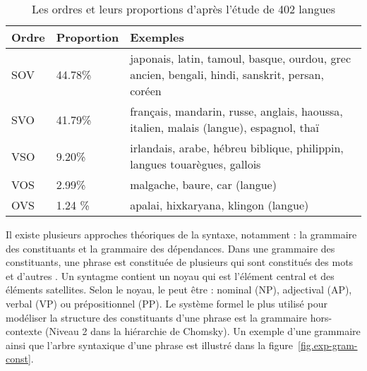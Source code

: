 \documentclass{KodeBook}
\begin{document}
\begin{table}[ht]
	\centering
	\begin{tabular}{p{}p{}p{}}
		\hline\hline 
		\textbf{Ordre} & \textbf{Proportion} & \textbf{Exemples} \\
		\hline
		SOV & 44.78\% & japonais, latin, tamoul, basque, ourdou, grec ancien, bengali, hindi, sanskrit, persan, coréen \\
		SVO & 41.79\% & français, mandarin, russe, anglais, haoussa, italien, malais (langue), espagnol, thaï \\
		VSO & 9.20\% & irlandais, arabe, hébreu biblique, philippin, langues touarègues, gallois \\
		VOS & 2.99\% & malgache, baure, car (langue) \\
		OVS & 1.24 \% & apalai, hixkaryana, klingon (langue) \\
		\hline\hline
	\end{tabular}
	\caption[Les ordres et leurs proportions d'après l'étude de 402 langues]{Les ordres et leurs proportions d'après l'étude de 402 langues \cite{1988-blake} \label{tab:ordre}}
\end{table}

Il existe plusieurs approches théoriques de la syntaxe, notamment : la grammaire des constituants et la grammaire des dépendances. 
Dans une grammaire des constituants, une phrase est constituée de plusieurs  qui sont constitués des mots et d'autres .
Un syntagme contient un noyau qui est l'élément central et des éléments satellites.
Selon le noyau, le  peut être : nominal (NP), adjectival (AP), verbal (VP) ou prépositionnel (PP).
Le système formel le plus utilisé pour modéliser la structure des constituants d'une phrase est la grammaire hors-contexte (Niveau 2 dans la hiérarchie de Chomsky).
Un exemple d'une grammaire ainsi que l'arbre syntaxique d'une phrase est illustré dans la figure~\ref{fig.exp-gram-const}.
\end{document}
